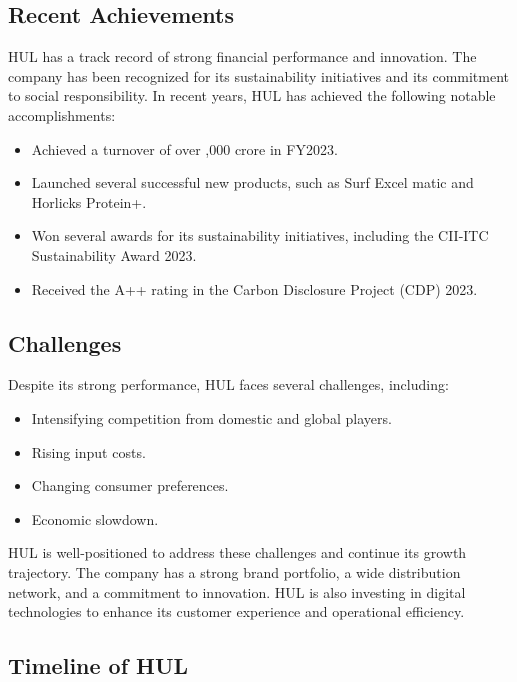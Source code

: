 \subsection{Recent Achievements}
HUL has a track record of strong financial performance and innovation. The company has been recognized for its sustainability initiatives and its commitment to social responsibility. In recent years, HUL has achieved the following notable accomplishments:

\begin{itemize}
    \item Achieved a turnover of over ,000 crore in FY2023.
    \item Launched several successful new products, such as Surf Excel matic and Horlicks Protein+.
    \item Won several awards for its sustainability initiatives, including the CII-ITC Sustainability Award 2023.
    \item Received the A++ rating in the Carbon Disclosure Project (CDP) 2023.
\end{itemize}

\subsection{Challenges}
Despite its strong performance, HUL faces several challenges, including:

\begin{itemize}
    \item Intensifying competition from domestic and global players.
    \item Rising input costs.
    \item Changing consumer preferences.
    \item Economic slowdown.
\end{itemize}

HUL is well-positioned to address these challenges and continue its growth trajectory. The company has a strong brand portfolio, a wide distribution network, and a commitment to innovation. HUL is also investing in digital technologies to enhance its customer experience and operational efficiency.

\subsection{Timeline of HUL}

